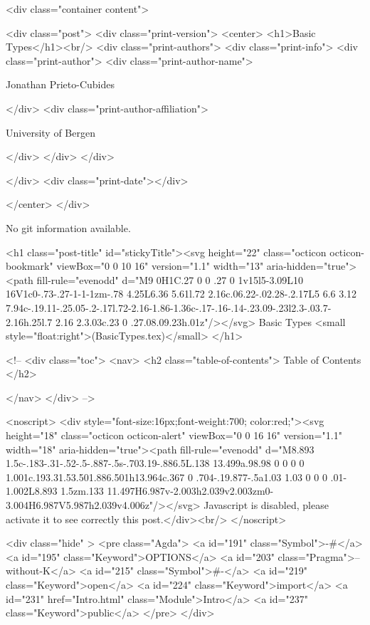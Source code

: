       <div class="container content">
        







<div class="post">
  <div class="print-version">
    <center>
      <h1>Basic Types</h1><br/>
        <div class="print-authors">
          <div class="print-info">
            <div class="print-author">
              <div class="print-author-name">
                
                  Jonathan Prieto-Cubides
                
              </div>
              <div class="print-author-affiliation">
                
                  University of Bergen
                
                </div>
            </div>
          </div>
          
          
        </div>
        <div class="print-date"></div>
        
        
    </center>
  </div>

  
  No git information available.
  

  <h1 class="post-title" id="stickyTitle"><svg height="22" class="octicon octicon-bookmark" viewBox="0 0 10 16" version="1.1" width="13" aria-hidden="true"><path fill-rule="evenodd" d="M9 0H1C.27 0 0 .27 0 1v15l5-3.09L10 16V1c0-.73-.27-1-1-1zm-.78 4.25L6.36 5.61l.72 2.16c.06.22-.02.28-.2.17L5 6.6 3.12 7.94c-.19.11-.25.05-.2-.17l.72-2.16-1.86-1.36c-.17-.16-.14-.23.09-.23l2.3-.03.7-2.16h.25l.7 2.16 2.3.03c.23 0 .27.08.09.23h.01z"/></svg> Basic Types <small style="float:right">(BasicTypes.tex)</small>
  </h1>

  <!-- 
  <div class="toc">
    <nav>
    <h2 class="table-of-contents"> Table of Contents </h2>
      

    </nav>
  </div>
   -->

  <noscript>
  <div style="font-size:16px;font-weight:700; color:red;"><svg height="18" class="octicon octicon-alert" viewBox="0 0 16 16" version="1.1" width="18" aria-hidden="true"><path fill-rule="evenodd" d="M8.893 1.5c-.183-.31-.52-.5-.887-.5s-.703.19-.886.5L.138 13.499a.98.98 0 0 0 0 1.001c.193.31.53.501.886.501h13.964c.367 0 .704-.19.877-.5a1.03 1.03 0 0 0 .01-1.002L8.893 1.5zm.133 11.497H6.987v-2.003h2.039v2.003zm0-3.004H6.987V5.987h2.039v4.006z"/></svg> Javascript is disabled, please activate it to see correctly this post.</div><br/>
  </noscript>

  <div class="hide" >
<pre class="Agda">
<a id="191" class="Symbol">{-#</a> <a id="195" class="Keyword">OPTIONS</a> <a id="203" class="Pragma">--without-K</a> <a id="215" class="Symbol">#-}</a>
<a id="219" class="Keyword">open</a> <a id="224" class="Keyword">import</a> <a id="231" href="Intro.html" class="Module">Intro</a> <a id="237" class="Keyword">public</a>
</pre>
</div>

